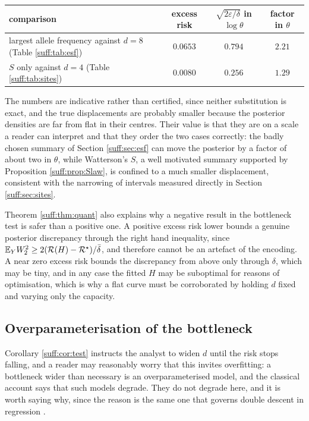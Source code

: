 \begin{center}
\begin{tabularx}{\textwidth}{>{\raggedright\arraybackslash}Xccc}
\toprule
comparison & excess risk & $\sqrt{2\varepsilon/\delta}$ in $\log\theta$ & factor in $\theta$ \\
\midrule
largest allele frequency against $d=8$ (Table \ref{suff:tab:esf})
 & $0.0653$ & $0.794$ & $2.21$ \\
$S$ only against $d=4$ (Table \ref{suff:tab:sites})
 & $0.0080$ & $0.256$ & $1.29$ \\
\bottomrule
\end{tabularx}
\end{center}

The numbers are indicative rather than certified, since neither substitution is exact, and
the true displacements are probably smaller because the posterior densities are far from flat
in their centres. Their value is that they are on a scale a reader can interpret and that they
order the two cases correctly: the badly chosen summary of Section \ref{suff:sec:esf} can move
the posterior by a factor of about two in $\theta$, while Watterson's $S$, a well motivated
summary supported by Proposition \ref{suff:prop:Slaw}, is confined to a much smaller
displacement, consistent with the narrowing of intervals measured directly in Section
\ref{suff:sec:sites}.

\begin{remark}
Theorem \ref{suff:thm:quant} also explains why a negative result in the bottleneck test is
safer than a positive one. A positive excess risk lower bounds a genuine posterior discrepancy
through the right hand inequality, since $\mathbb{E}_YW_2^2\ge 2(\mathcal{R}(H)-\mathcal{R}^\star)/\bar\delta$,
and therefore cannot be an artefact of the encoding. A near zero excess risk bounds the
discrepancy from above only through $\delta$, which may be tiny, and in any case the fitted
$H$ may be suboptimal for reasons of optimisation, which is why a flat curve must be
corroborated by holding $d$ fixed and varying only the capacity.
\end{remark}

\subsection{Overparameterisation of the bottleneck}
\label{suff:sec:overparam2}

Corollary \ref{suff:cor:test} instructs the analyst to widen $d$ until the risk stops falling,
and a reader may reasonably worry that this invites overfitting: a bottleneck wider than
necessary is an overparameterised model, and the classical account says that such models
degrade. They do not degrade here, and it is worth saying why, since the reason is the same
one that governs double descent in regression \citep{suff:belkin2019,suff:polsonsokolov2025}.

